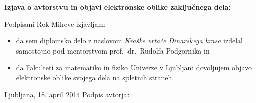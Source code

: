 \documentclass[a4paper, twoside, 12pt]{book}
\begin{document}
    \newpage \thispagestyle{empty}



    \vspace*{1cm}
    \begin{center} {\Large \textbf{\sc Izjava o avtorstvu in objavi elektronske oblike zaključnega dela: }} \end{center}

      \vspace{1cm} \noindent Podpisani Rok Mihevc izjavljam:
      \noindent 

      \begin{itemize}
        \item 
          da sem diplomsko delo z naslovom \emph{Kraške vrtače Dinarskega krasa} izdelal samostojno pod mentorstvom prof.\ dr.\ \mbox{Rudolfa} \mbox{Podgornika} in
        \item
          da Fakulteti za matematiko in fiziko Univerze v Ljubljani dovoljujem objavo elektronske 
          oblike svojega dela na spletnih straneh.
      \end{itemize}

      \vspace{1cm} \noindent Ljubljana, 18. april 2014 \hfill Podpis avtorja:


      
\end{document}
